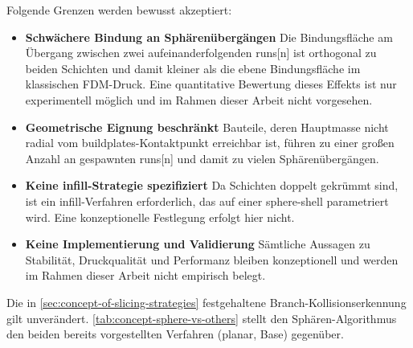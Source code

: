                 Folgende Grenzen werden bewusst akzeptiert:
                \begin{itemize}
                    \item \textbf{Schwächere Bindung an Sphärenübergängen}
                        Die Bindungsfläche am Übergang zwischen zwei aufeinanderfolgenden \glspl{run}[n] ist orthogonal zu beiden Schichten und damit kleiner als die ebene Bindungsfläche im klassischen \ac{FDM}-Druck.
                        Eine quantitative Bewertung dieses Effekts ist nur experimentell möglich und im Rahmen dieser Arbeit nicht vorgesehen.
                    \item \textbf{Geometrische Eignung beschränkt}
                        Bauteile, deren Hauptmasse nicht radial vom \glspl{buildplate}-Kontaktpunkt erreichbar ist, führen zu einer großen Anzahl an gespawnten \glspl{run}[n] und damit zu vielen Sphärenübergängen.
                    \item \textbf{Keine \gls{infill}-Strategie spezifiziert}
                        Da Schichten doppelt gekrümmt sind, ist ein \gls{infill}-Verfahren erforderlich, das auf einer \gls{sphere-shell} parametriert wird.
                        Eine konzeptionelle Festlegung erfolgt hier nicht.
                    \item \textbf{Keine Implementierung und Validierung}
                        Sämtliche Aussagen zu Stabilität, Druckqualität und Performanz bleiben konzeptionell und werden im Rahmen dieser Arbeit nicht empirisch belegt.
                \end{itemize}

                Die in \cref{sec:concept-of-slicing-strategies} festgehaltene Branch-Kollisionserkennung gilt unverändert.
                \cref{tab:concept-sphere-vs-others} stellt den Sphären-Algorithmus den beiden bereits vorgestellten Verfahren (planar, Base) gegenüber.

